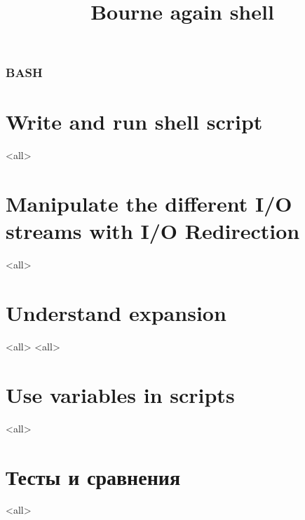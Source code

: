 
\title[bash]{Bourne again shell}




\begin{frame}
	\frametitle{BASH}
	\titlepage
	\vspace{-0.5cm}
	\begin{center}
	\end{center}
\end{frame}

\begin{frame}
	\tableofcontents
\end{frame}




\section{Write and run shell script}
\mode<all>{}

\section{Manipulate the different I/O streams  with I/O Redirection}
\mode<all>{}

\section{Understand expansion}
\mode<all>{}
\mode<all>{}

\section{Use variables in scripts}

\mode<all>{}

\section{Тесты и сравнения}
\mode<all>{}


